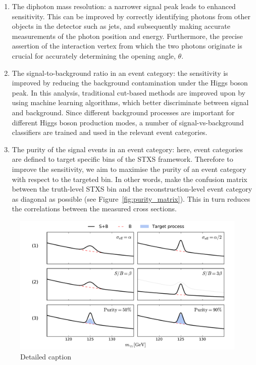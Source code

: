 \begin{enumerate}
    \item The diphoton mass resolution: a narrower signal peak leads to enhanced sensitivity. This can be improved by correctly identifying photons from other objects in the detector such as jets, and subsequently making accurate measurements of the photon position and energy. Furthermore, the precise assertion of the interaction vertex from which the two photons originate is crucial for accurately determining the opening angle, $\theta$.
    
    \item The signal-to-background ratio in an event category: the sensitivity is improved by reducing the background contamination under the Higgs boson peak. In this analysis, traditional cut-based methods are improved upon by using machine learning algorithms, which better discriminate between signal and background. Since different background processes are important for different Higgs boson production modes, a number of signal-vs-background classifiers are trained and used in the relevant event categories.
    
    \item The purity of the signal events in an event category: here, event categories are defined to target specific bins of the STXS framework. Therefore to improve the sensitivity, we aim to maximise the purity of an event category with respect to the targeted bin. In other words, make the confusion matrix between the truth-level STXS bin and the reconstruction-level event category as diagonal as possible (see Figure~\ref{fig:purity_matrix}). This in turn reduces the correlations between the measured cross sections.
\end{enumerate}

\begin{figure}[hptb]
  \centering
  \includegraphics[width=1\textwidth]{Figures/hgg_overview/hgg_improve_measurement.pdf}
  \caption[Avenues for improving \Hgg measurements.]
  {
    Detailed caption
  }
  \label{fig:hgg_overview_improving_measurements}
\end{figure}

